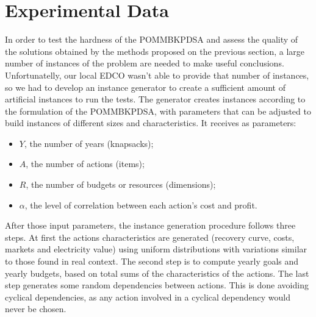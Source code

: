 \section{Experimental Data}
\label{sec:exp_data}

In order to test the hardness of the POMMBKPDSA and assess the quality of the solutions obtained by the methods 
proposed on the previous section, a large number of instances of the problem are needed to make useful 
conclusions. Unfortunatelly, our local EDCO wasn't able to provide that number of instances, so we had 
to develop an instance generator to create a sufficient amount of artificial instances to run the tests. 
The generator creates instances according to the formulation of the POMMBKPDSA, with parameters that can be 
adjusted to build instances of different sizes and characteristics. It receives as parameters:
\begin{itemize}
  \item $Y$, the number of years (knapsacks);
  \item $A$, the number of actions (items);
  \item $R$, the number of budgets or resources (dimensions);
  \item $\alpha$, the level of correlation between each action's cost and profit.
\end{itemize}
After those input parameters, the instance generation procedure follows three steps.
At first the actions characteristics are generated (recovery curve, costs, markets and electricity value)
using uniform distributions with variations similar to those found in real context.
The second step is to compute yearly goals and yearly budgets,
based on total sums of the characteristics of the actions.
The last step generates some random dependencies between actions.
This is done avoiding cyclical dependencies, as any action involved in a cyclical 
dependency would never be chosen.


